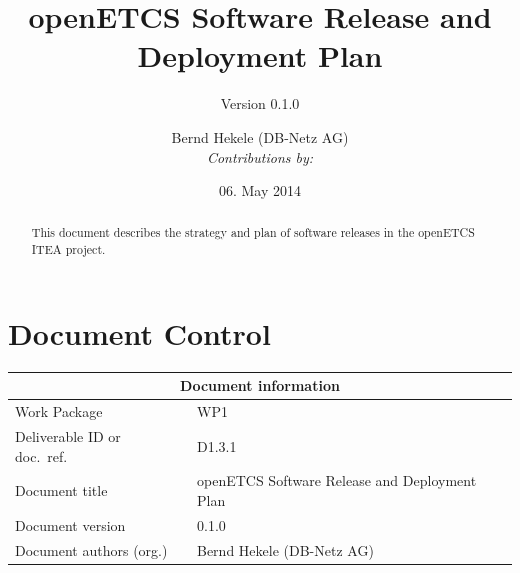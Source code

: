 \documentclass{template/openetcs_report}
\begin{document}
\frontmatter
{}




\title{openETCS Software Release and Deployment Plan}

\subtitle{Version 0.1.0}

\date{06. May 2014}


\author{
Bernd Hekele (DB-Netz AG)\\
\small
{\it Contributions by:} \\}

  




\begin{abstract}

This document describes the strategy and plan of software releases in the openETCS ITEA project.


\end{abstract}

\maketitle
\tableofcontents
\listoffiguresandtables
\newpage

\chapter{Document Control}

\begin{tabular}{|p{4.4cm}|p{8.7cm}|}
  \hline
  \multicolumn{2}{|c|}{Document information} \\
  \hline
  Work Package &  WP1  \\
  Deliverable ID or doc.\ ref.\ & D1.3.1\\
  \hline
  Document title & openETCS Software Release and Deployment Plan\\
  Document version & 0.1.0 \\
  Document authors (org.)  &  Bernd Hekele (DB-Netz AG)\\
  \hline
\end{tabular}
\end{document}
